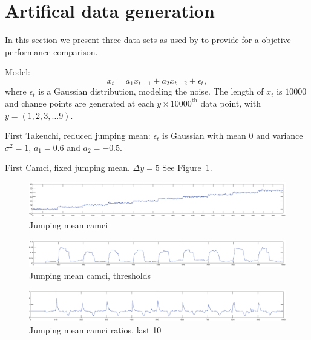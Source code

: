 \section{Artifical data generation}\label{sec:artificial_data_generation}
In this section we present three data sets as used by \cite{camci2010change,takeuchi2006unifying} to provide for a objetive performance comparison.

Model:
\begin{equation}
  x_t = a_1 x_{t-1} + a_2 x_{t-2} + \epsilon_t,
\end{equation}
where $\epsilon_t$ is a Gaussian distribution, modeling the noise.
The length of $x_t$ is $10000$ and change points are generated at each $y \times 10000^\text{th}$ data point, with $y = (1, 2, 3, \dots 9)$.

First Takeuchi, reduced jumping mean:
$\epsilon_t$ is Gaussian with mean $0$ and variance $\sigma^2 = 1$, $a_1 = 0.6$ and $a_2 = -0.5$.


First Camci, fixed jumping mean.
$\Delta y = 5$
See Figure~\ref{fig:camci_mean_fixed}.


\begin{figure}
\centering
  \includegraphics[width=1\textwidth]{./Figures/notes/jumping_mean_camci.eps}
  \caption[Jumping mean camci]{Jumping mean camci}
  \label{fig:camci_mean_fixed}
\end{figure}

\begin{figure}
\centering
  \includegraphics[width=1\textwidth]{./Figures/notes/jumping_mean_camci_thresholds.eps}
  \caption[Jumping mean camci thresholds]{Jumping mean camci, thresholds}
\end{figure}

\begin{figure}
\centering
  \includegraphics[width=1\textwidth]{./Figures/notes/jumping_mean_camci_ratios_10.eps}
  \caption[Jumping mean camci ratios]{Jumping mean camci ratios, last 10}
  \label{fig:jumping_mean_ratios}
\end{figure}

